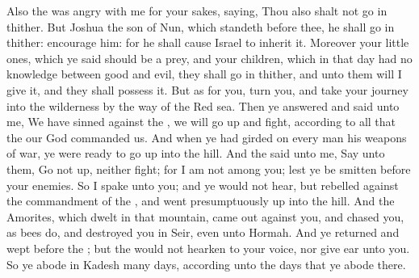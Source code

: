 \begin{biblechapter}
\verse Also the \LORD was angry with me for your sakes, saying, Thou also shalt not go in thither.
\verse But Joshua the son of Nun, which standeth before thee, he shall go in thither: encourage him: for he shall cause Israel to inherit it.
\verse Moreover your little ones, which ye said should be a prey, and your children, which in that day had no knowledge between good and evil, they shall go in thither, and unto them will I give it, and they shall possess it.
\verse But as for you, turn you, and take your journey into the wilderness by the way of the Red sea.
\verse Then ye answered and said unto me, We have sinned against the \LORD, we will go up and fight, according to all that the \LORD our God commanded us. And when ye had girded on every man his weapons of war, ye were ready to go up into the hill.
\verse And the \LORD said unto me, Say unto them, Go not up, neither fight; for I am not among you; lest ye be smitten before your enemies.
\verse So I spake unto you; and ye would not hear, but rebelled against the commandment of the \LORD, and went presumptuously up into the hill.
\verse And the Amorites, which dwelt in that mountain, came out against you, and chased you, as bees do, and destroyed you in Seir, even unto Hormah.
\verse And ye returned and wept before the \LORD; but the \LORD would not hearken to your voice, nor give ear unto you.
\verse So ye abode in Kadesh many days, according unto the days that ye abode there.
\end{biblechapter}

